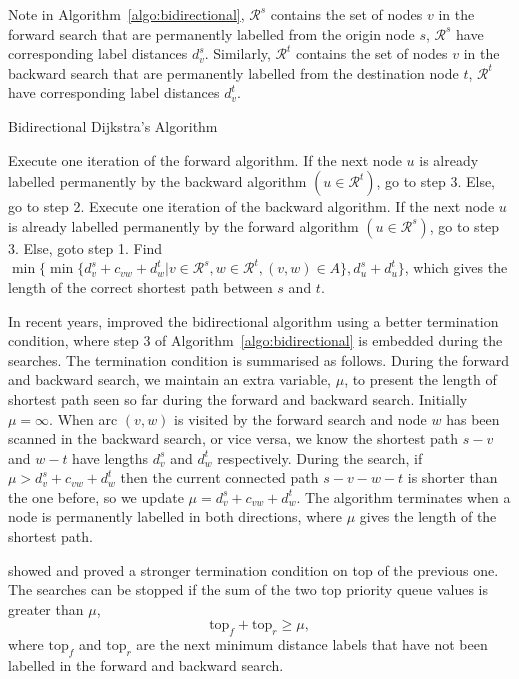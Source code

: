 Note in Algorithm~\ref{algo:bidirectional},
$\mathcal{R}^s$ contains the set of nodes $v$ in the forward search that are permanently labelled from the origin node $s$,
$\mathcal{R}^s$ have corresponding label distances $d_v^s$.
Similarly, $\mathcal{R}^t$ contains the set of nodes $v$ in the backward search that are permanently labelled from the destination node $t$,
$\mathcal{R}^t$ have corresponding label distances $d_v^t$.

\begin{algorithm}[!ht]
    \caption{Bidirectional Dijkstra's Algorithm}
    \label{algo:bidirectional}
    \begin{algorithmic}[1]
        \State Execute one iteration of the forward algorithm.
        If the next node $u$ is already labelled permanently by the 
        backward algorithm $(u\in\mathcal{R}^t)$, go to step 3.
        Else, go to step 2.
        \State Execute one iteration of the backward algorithm.
        If the next node $u$ is already labelled permanently by the
        forward algorithm $(u\in\mathcal{R}^s)$, go to step 3.
        Else, goto step 1.
        \State Find $\min\{\min\{d_v^s + c_{vw} + d_w^t | v \in \mathcal{R}^s, w \in \mathcal{R}^t, (v, w) \in A\}, d_u^s + d_u^t\}$, which gives the length of the correct shortest path between $s$ and $t$.
    \EndProcedure
\end{algorithmic}
\end{algorithm}

In recent years,
\citet{Goldberg05} improved the bidirectional algorithm using a better termination condition,
where step 3 of Algorithm~\ref{algo:bidirectional} is embedded during the searches.
The termination condition is summarised as follows.
During the forward and backward search,
we maintain an extra variable, $\mu$, to present the length of shortest path seen so far during the forward and backward search.
Initially $\mu = \infty$.
When arc $(v,w)$ is visited by the forward search and node $w$ has been scanned in the backward search, or vice versa,
we know the shortest path $s-v$ and $w-t$ have lengths $d_v^s$ and $d_w^t$ respectively.
During the search, if $\mu > d_v^s + c_{vw} + d_w^t$ then the current connected path $s-v-w-t$ is shorter than the one before, 
so we update $\mu = d_v^s + c_{vw} + d_w^t$.
The algorithm terminates when a node is permanently labelled in both directions,
where $\mu$ gives the length of the shortest path.

\citet{GoldbergEPP} showed and proved a stronger termination condition on top of the previous one.
The searches can be stopped if the sum of the two top priority queue values is greater than $\mu$,
\[
    \text{top}_f + \text{top}_r \geq \mu,
\]
where $\text{top}_f$ and $\text{top}_r$ are the next minimum distance labels that have not been labelled in the forward and backward search.

